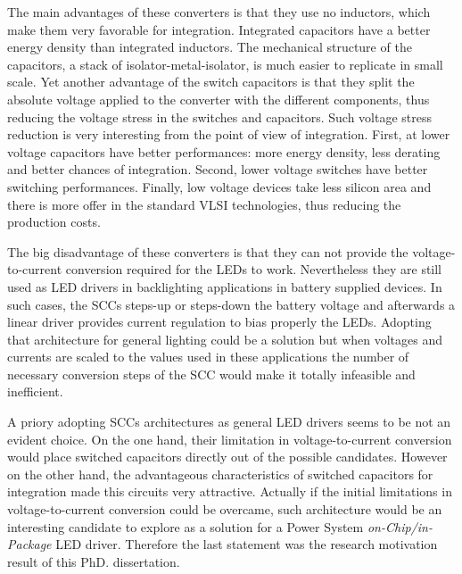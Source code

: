 The main advantages of these converters is that they use no inductors, which make them very favorable for integration. Integrated capacitors have a better energy density than integrated inductors. The mechanical structure of the capacitors, a stack of isolator-metal-isolator, is much easier to replicate in small scale. Yet another advantage of the switch capacitors is that they split the absolute voltage applied to the converter with the different components, thus reducing the voltage stress in the switches and capacitors. Such voltage stress reduction is very interesting from the point of view of integration. First, at lower voltage capacitors have better performances: more energy density, less derating and better chances of integration. Second, lower voltage switches have better switching performances. Finally, low voltage devices take less silicon area and there is more offer in the standard VLSI technologies, thus reducing the production costs.  

The big disadvantage of these converters is that they can not provide the voltage-to-current conversion required for the LEDs to work. Nevertheless they are still used as LED drivers in backlighting applications in battery supplied devices. In such cases, the SCCs steps-up or steps-down the battery voltage and afterwards a linear driver  provides current regulation to bias properly the LEDs. Adopting that architecture for general lighting could be a solution but when  voltages and currents are scaled to the values used in these applications the number of necessary conversion steps of the SCC would make it totally infeasible and inefficient.

A priory adopting SCCs architectures as general LED drivers seems to be not an evident choice. On the one hand, their limitation in voltage-to-current conversion would place switched capacitors directly out of the possible candidates. However on the other hand, the advantageous characteristics of switched capacitors for integration made this circuits very attractive. Actually if the initial limitations in voltage-to-current conversion could be overcame, such architecture would be an interesting candidate to explore as a solution for a Power System \emph{on-Chip/in-Package} LED driver. Therefore the last statement was the research motivation  result of this PhD. dissertation.

